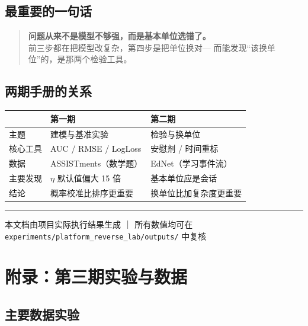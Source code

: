 \documentclass[UTF8,a4paper,11pt]{ctexart}
\begin{document}
\subsection{最重要的一句话}

\begin{quote}
\large
\textbf{问题从来不是模型不够强，而是基本单位选错了。}\\[6pt]
前三步都在把模型改复杂，第四步是把单位换对---
而能发现“该换单位”的，是那两个检验工具。
\end{quote}

\subsection{两期手册的关系}

\begin{center}
\begin{tabular}{p{4.2cm}p{5.4cm}p{5.0cm}}
\toprule
& \textbf{第一期} & \textbf{第二期} \\
\midrule
主题 & 建模与基准实验 & 检验与换单位 \\
核心工具 & AUC / RMSE / LogLoss & 安慰剂 / 时间重标 \\
数据 & ASSISTments（数学题） & EdNet（学习事件流） \\
主要发现 & $\eta$ 默认值偏大 15 倍 & 基本单位应是会话 \\
结论 & 概率校准比排序更重要 & 换单位比加复杂度更重要 \\
\bottomrule
\end{tabular}
\end{center}

\vspace{12pt}
\hrule
\vspace{6pt}
\begin{center}
\small 本文档由项目实际执行结果生成 ｜
所有数值均可在 \texttt{experiments/platform\_reverse\_lab/outputs/} 中复核
\end{center}




\section{附录：第三期实验与数据}

\subsection{主要数据实验}
\end{document}
